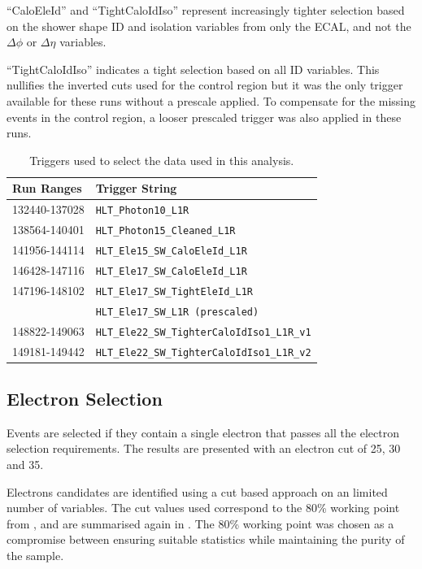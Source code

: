 ``CaloEleId'' and ``TightCaloIdIso'' represent increasingly tighter selection
based on the shower shape ID and isolation variables from only the \ac{ECAL},
and not the $\Delta\phi$ or $\Delta\eta$ variables.  

``TightCaloIdIso'' indicates a tight selection based on all ID variables. 
This nullifies the inverted cuts used for the control region but
it was the only trigger available for these runs without a prescale applied.
To compensate for the missing events in the control region, a looser prescaled
trigger was also applied in these runs.

\begin{table}[htbp]
  \centering
  \begin{tabular}{ l l }
    \toprule
    Run Ranges & Trigger String\\
    \midrule
    132440-137028 & \verb=HLT_Photon10_L1R= \\
    138564-140401 & \verb=HLT_Photon15_Cleaned_L1R= \\
    141956-144114 & \verb=HLT_Ele15_SW_CaloEleId_L1R= \\
    146428-147116 & \verb=HLT_Ele17_SW_CaloEleId_L1R= \\
    147196-148102 & \verb=HLT_Ele17_SW_TightEleId_L1R= \\
                  & \verb=HLT_Ele17_SW_L1R (prescaled)= \\ 
    148822-149063 & \verb=HLT_Ele22_SW_TighterCaloIdIso1_L1R_v1= \\
    149181-149442 & \verb=HLT_Ele22_SW_TighterCaloIdIso1_L1R_v2= \\
    \bottomrule
  \end{tabular}
  \caption{Triggers used to select the data used in this analysis.}
  \label{tab:triggers}
\end{table}

\subsection{Electron Selection}
Events are selected if they contain a single electron that passes all the electron
selection requirements. The results are presented with an electron \pT cut of
25, 30 and \unit{35}{\GeV}.

Electrons candidates are identified using a cut based approach on an limited
number of variables. The cut values used correspond to the \unit{80}{\%}
working point from , and are summarised again in
. The \unit{80}{\%} working point was chosen as a
compromise between ensuring suitable statistics while maintaining the purity of
the sample.

